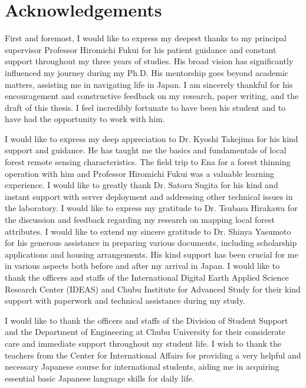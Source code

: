 \chapter*{Acknowledgements}
First and foremost, I would like to express my deepest thanks to my principal supervisor Professor Hiromichi Fukui for his patient guidance and constant support throughout my three years of studies. His broad vision has significantly influenced my journey during my Ph.D. His mentorship goes beyond academic matters, assisting me in navigating life in Japan. I am sincerely thankful for his encouragement and constructive feedback on my research, paper writing, and the draft of this thesis. I feel incredibly fortunate to have been his student and to have had the opportunity to work with him. \par

I would like to express my deep appreciation to Dr. Kyoshi Takejima for his kind support and guidance. He has taught me the basics and fundamentals of local forest remote sensing characteristics. The field trip to Ena for a forest thinning operation with him and Professor Hiromichi Fukui was a valuable learning experience. I would like to greatly thank Dr. Satoru Sugita for his kind and instant support with server deployment and addressing other technical issues in the laboratory. I would like to express my gratitude to Dr. Tsubasa Hirakawa for the discussion and feedback regarding my research on mapping local forest attributes. I would like to extend my sincere gratitude to Dr. Shinya Yasumoto for his generous assistance in preparing various documents, including scholarship applications and housing arrangements. His kind support has been crucial for me in various aspects both before and after my arrival in Japan. I would like to thank the officers and staffs of the International Digital Earth Applied Science Research Center (IDEAS) and Chubu Institute for Advanced Study for their kind support with paperwork and technical assistance during my study. \par

I would like to thank the officers and staffs of the Division of Student Support and the Department of Engineering at Chubu University for their considerate care and immediate support throughout my student life. I wish to thank the teachers from the Center for International Affairs for providing a very helpful and necessary Japanese course for international students, aiding me in acquiring essential basic Japanese language skills for daily life. \par

